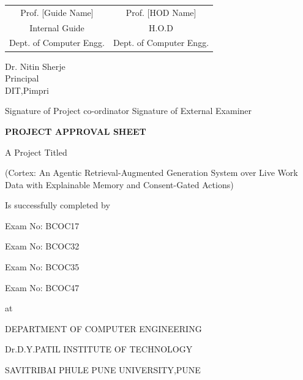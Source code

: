 \documentclass[oneside,a4paper,12pt]{report}
\newcommand{\ProjectTitle}{Cortex: An Agentic Retrieval-Augmented Generation System over Live Work Data with Explainable Memory and Consent-Gated Actions}
\begin{document}
\bgroup
\def\arraystretch{0.9}\vspace*{0.5\baselineskip}\vspace*{0.5\baselineskip}
\begin{tabular}{c c }
Prof. [Guide Name] &  \hspace{50 mm} Prof. [HOD Name] \\
Internal Guide   &  \hspace{50 mm} H.O.D \\
Dept. of Computer Engg.  &	\hspace{50 mm}Dept. of Computer Engg.  \\
\end{tabular}
\egroup %
\begin{center}
{
Dr. Nitin Sherje \\
Principal\\
DIT,Pimpri
}
\end{center}
\vspace*{2\baselineskip} %


Signature of Project co-ordinator \hspace{15 mm} Signature of External Examiner
\newpage
\begin{center}
\textbf{PROJECT APPROVAL SHEET}
\end{center}
\begin{center}
 A Project Titled
 \end{center} %
\begin{center}
(\ProjectTitle)
\end{center} %
\begin{center}
Is successfully completed by
\end{center}
\centerline{  \hspace{25 mm} Exam No: BCOC17}
\centerline{ \hspace{25 mm} Exam No: BCOC32}
\centerline{ \hspace{25 mm} Exam No: BCOC35}
\centerline{ \hspace{25 mm} Exam No: BCOC47}
\begin{center}
 at
 \end{center}
 \begin{center}
 DEPARTMENT OF COMPUTER ENGINEERING
 \end{center}
 \begin{center}
 Dr.D.Y.PATIL INSTITUTE OF TECHNOLOGY
 \end{center}
 \begin{center}
 SAVITRIBAI PHULE PUNE UNIVERSITY,PUNE
 \end{center}
\end{document}

